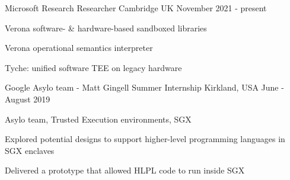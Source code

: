 


\begin{cventries}

\cventry
{Microsoft Research}
{Researcher}
{Cambridge UK}
{November 2021 - present}
{
  \begin{cvitems}
  \item{Verona software- \& hardware-based sandboxed libraries}
  \item{Verona operational semantics interpreter}
  \item{Tyche: unified software TEE on legacy hardware}
  \end{cvitems}
}

\cventry
{Google Asylo team - Matt Gingell}
{Summer Internship}
{Kirkland, USA}
{June - August 2019}
{ 
  \begin{cvitems}
  \item{Asylo team, Trusted Execution environments, SGX}
	\item{Explored potential designs to support higher-level programming languages in SGX enclaves}
  \item{Delivered a prototype that allowed HLPL code to run inside SGX}
	\end{cvitems}
}

\end{cventries}
